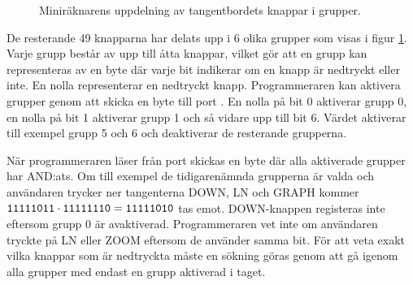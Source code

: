 \documentclass[main.tex]{subfiles}
\begin{document}
\begin{figure}[b]
    \center
    \caption{Miniräknarens uppdelning av tangentbordets knappar i grupper.}
    \label{fig:keygroups}
\end{figure}

De resterande 49 knapparna har delats upp i 6 olika grupper som visas i figur
\ref{fig:keygroups}. Varje grupp består av upp till åtta knappar, vilket gör
att en grupp kan representeras av en byte där varje bit indikerar om en knapp
är nedtryckt eller inte. En nolla representerar en nedtryckt knapp.
Programmeraren kan aktivera grupper genom att skicka en byte till port
. En nolla på bit 0 aktiverar grupp 0, en nolla på bit 1 aktiverar
grupp 1 och så vidare upp till bit 6. Värdet  aktiverar till
exempel grupp 5 och 6 och deaktiverar de resterande grupperna.

När programmeraren läser från port  skickas en byte där alla
aktiverade grupper har AND:ats. Om till exempel de tidigarenämnda grupperna är
valda och användaren trycker ner tangenterna DOWN, LN och GRAPH kommer
$\texttt{11111011} \cdot \texttt{11111110} = \texttt{11111010}$ tas emot.
DOWN-knappen registeras inte eftersom grupp 0 är avaktiverad. Programmeraren
vet inte om användaren tryckte på LN eller ZOOM eftersom de använder samma bit.
För att veta exakt vilka knappar som är nedtryckta måste en sökning göras genom
att gå igenom alla grupper med endast en grupp aktiverad i taget.
\end{document}
